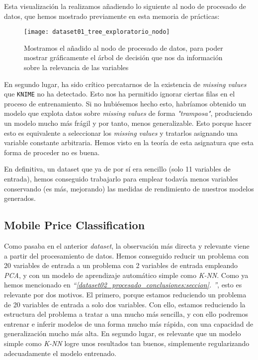 \documentclass[11pt]{article}
\newcommand{\customcite}[1]{\emph{``\ref{#1}. \nameref{#1}''}}
\begin{document}
Esta visualización la realizamos añadiendo lo siguiente al nodo de procesado de datos, que hemos mostrado previamente en esta memoria de prácticas:

\begin{figure}[H]
    \centering
    \texttt{[image: dataset01\_tree\_exploratorio\_nodo]}
    \caption{Mostramos el añadido al nodo de procesado de datos, para poder mostrar gráficamente el árbol de decisión que nos da información sobre la relevancia de las variables}
\end{figure}

En segundo lugar, ha sido crítico percatarnos de la existencia de \emph{missing values} que \lstinline{KNIME} no ha detectado. Esto nos ha permitido ignorar ciertas filas en el proceso de entrenamiento. Si no hubiésemos hecho esto, habríamos obtenido un modelo que explota datos sobre \emph{missing values} de forma \emph{"tramposa"}, produciendo un modelo mucho más frágil y por tanto, menos generalizable. Esto porque hacer esto es equivalente a seleccionar los \emph{missing values} y tratarlos asignando una variable constante arbitraria. Hemos visto en la teoría de esta asignatura que esta forma de proceder no es buena.

En definitiva, un dataset que ya de por sí era sencillo (solo 11 variables de entrada), hemos conseguido trabajarlo para emplear todavía menos variables conservando (es más, mejorando) las medidas de rendimiento de nuestros modelos generados.

\pagebreak

\subsection{Mobile Price Classification} \label{knn_buenos_resultados:seccion}

Como pasaba en el anterior \emph{dataset}, la observación más directa y relevante viene a partir del procesamiento de datos. Hemos conseguido reducir un problema con 20 variables de entrada a un problema con 2 variables de entrada empleando \emph{PCA}, y con un modelo de aprendizaje automático simple como \emph{K-NN}. Como ya hemos mencionado en \customcite{dataset02_procesado_conclusiones:seccion}, esto es relevante por dos motivos. El primero, porque estamos reduciendo un problema de 20 variables de entrada a solo dos variables. Con ello, estamos reduciendo la estructura del problema a tratar a una mucho más sencilla, y con ello podremos entrenar e inferir modelos de una forma mucho más rápida, con una capacidad de generalización mucho más alta. En segundo lugar, es relevante que un modelo simple como \emph{K-NN} logre unos resultados tan buenos, simplemente regularizando adecuadamente el modelo entrenado.
\end{document}
